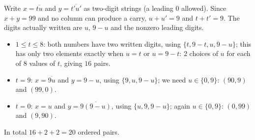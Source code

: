 Write $x=\overline{tu}$ and $y=\overline{t'u'}$ as two-digit strings (a leading $0$ allowed). Since $x+y=99$ and no column can produce a carry, $u+u'=9$ and $t+t'=9$. The digits actually written are $u$, $9-u$ and the nonzero leading digits.
\begin{itemize}
\item $1\le t\le8$: both numbers have two written digits, using $\{t,9-t,u,9-u\}$; this has only two elements exactly when $u=t$ or $u=9-t$: $2$ choices of $u$ for each of $8$ values of $t$, giving $16$ pairs.
\item $t=9$: $x=\overline{9u}$ and $y=9-u$, using $\{9,u,9-u\}$; we need $u\in\{0,9\}$: $(90,9)$ and $(99,0)$.
\item $t=0$: $x=u$ and $y=\overline{9(9-u)}$, using $\{u,9,9-u\}$; again $u\in\{0,9\}$: $(0,99)$ and $(9,90)$.
\end{itemize}
In total $16+2+2=\boxed{20}$ ordered pairs.
